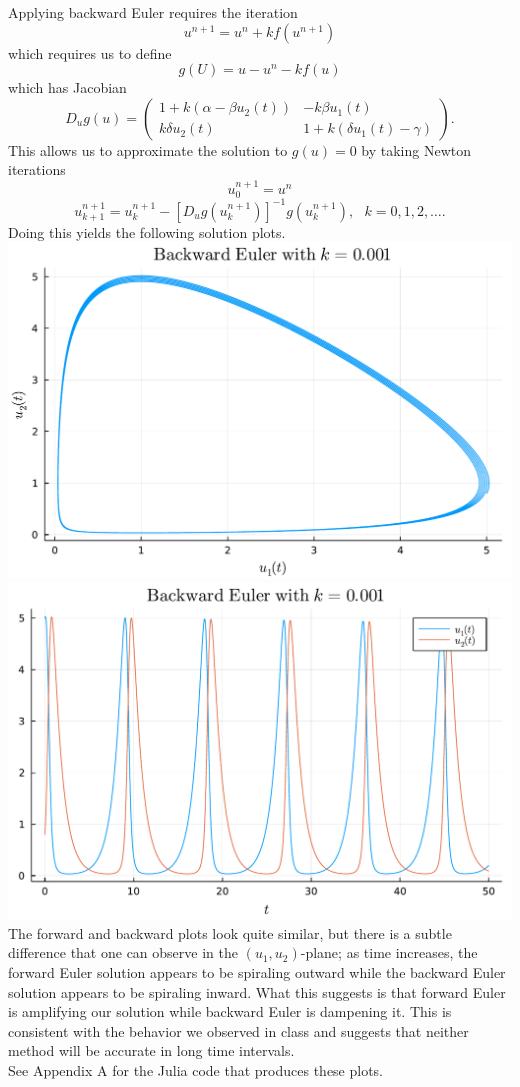 \documentclass{article}
\begin{document}
Applying backward Euler requires the iteration
\[
u^{n+1}=u^n+kf(u^{n+1})
\]
which requires us to define
\[
g(U) = u - u^n - kf(u)
\]
which has Jacobian
\[
D_u g(u) = \begin{pmatrix} 1+k(\alpha-\beta u_2(t)) & -k\beta u_1(t)\\ k\delta u_2(t) & 1+k(\delta u_1(t)-\gamma) \end{pmatrix}.
\]
This allows us to approximate the solution to $g(u)=0$ by taking Newton iterations
$$u^{n+1}_{0} = u^n$$
$$u^{n+1}_{k+1} = u^{n+1}_{k} - [D_u g(u^{n+1}_{k})]^{-1} g(u^{n+1}_{k}), ~~~k = 0,1,2,\ldots.$$
Doing this yields the following solution plots.\\
\includegraphics[scale=0.5]{be1.pdf}\\
\includegraphics[scale=0.5]{be2.pdf}\\
The forward and backward plots look quite similar, but there is a subtle difference that one can observe in the $(u_1,u_2)$-plane; as time increases, the forward Euler solution appears to be spiraling outward while the backward Euler solution appears to be spiraling inward. What this suggests is that forward Euler is amplifying our solution while backward Euler is dampening it. This is consistent with the behavior we observed in class and suggests that neither method will be accurate in long time intervals. \\See Appendix A for the Julia code that produces these plots.
\end{document}
